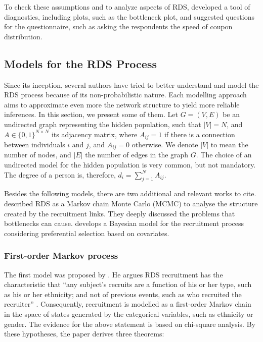 To check these assumptions and to analyze aspects of RDS,
\textcite{gile2015diagnostics} developed a tool of diagnostics, including
plots, such as the bottleneck plot, and suggested questions for the
questionnaire, such as asking the respondents the speed of coupon distribution.

\subsection{Models for the RDS Process}
\label{sec:models-rds-process}

Since its inception, several authors have tried to better understand and model
the RDS process because of its non-probabilistic nature. Each modelling approach
aims to approximate even more the network structure to yield more reliable
inferences. In this section, we present some of them. Let $G = (V,E)$ be an
undirected graph representing the hidden population, such that $|V| = N$, and
$A \in \{0,1\}^{N \times N}$ its adjacency matrix, where $A_{ij} = 1$ if there
is a connection between individuals $i$ and $j$, and $A_{ij} = 0$ otherwise.
We denote $|V|$ to mean the number of nodes, and $|E|$ the number of edges in
the graph $G$. The choice of an undirected model for the hidden population is very common,
but not mandatory. The degree of a person is, therefore, $d_i = \sum_{j=1}^N
A_{ij}$.

Besides the following models, there are two additional and relevant works  to
cite. \textcite{goel2009respondent} described RDS as a Markov chain Monte
Carlo (MCMC) to analyse the structure created by the recruitment links. They deeply
discussed the problems that bottlenecks can cause.
\textcite{mclaughlin2021bayesian} develops a Bayesian model for the
recruitment process considering preferential selection based on covariates.


\subsubsection{First-order Markov process}
\label{sec:first-order-markov-process}

The first model was proposed by \textcite{heckathorn1997}. 
He argues RDS recruitment has the characteristic that ``any subject's recruits are
a function of his or her type, such as his or her ethnicity; and not of
previous events, such as who recruited the recruiter'' \cite[p. 182]{heckathorn1997}. Consequently, 
recruitment is modelled as a first-order Markov chain in the space of states
generated by the categorical variables, such as ethnicity or gender. The
evidence for the above statement is based on chi-square analysis. By these
hypotheses, the paper derives three theorems: 

